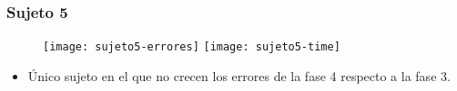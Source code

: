 \begin{frame}
	\frametitle{Sujeto 5}
	\begin{figure}
		\centering
		
		\texttt{[image: sujeto5-errores]}
		\texttt{[image: sujeto5-time]}
	\end{figure}
	\begin{itemize}
		\item Único sujeto en el que no crecen los errores de la fase 4 respecto a la fase 3.
	\end{itemize}
\end{frame}